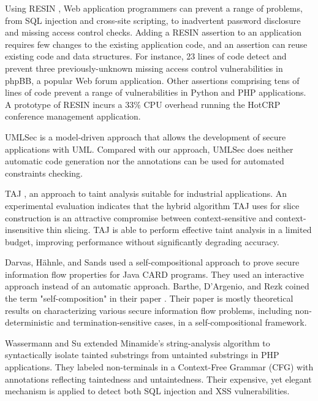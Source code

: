 Using RESIN \cite{ref_63_yip2009improving}, Web application programmers can prevent a range
of problems, from SQL injection and cross-site scripting, to inadvertent password disclosure and missing access control checks. Adding
a RESIN assertion to an application requires few changes to the
existing application code, and an assertion can reuse existing code
and data structures. For instance, 23 lines of code detect and prevent
three previously-unknown missing access control vulnerabilities in
phpBB, a popular Web forum application. Other assertions comprising tens of lines of code prevent a range of vulnerabilities in Python
and PHP applications. A prototype of RESIN incurs a 33\% CPU
overhead running the HotCRP conference management application.

UMLSec \cite{ref_33_juerjens:secure} is a model-driven approach that allows the
development of secure applications with UML. Compared with
our approach, UMLSec does neither automatic code
generation nor the annotations can be used for automated
constraints checking.

TAJ \cite{ref_100_tripp2009taj}, an approach to taint analysis suitable for industrial applications. An experimental evaluation indicates that
the hybrid algorithm TAJ uses for slice construction is an attractive
compromise between context-sensitive and context-insensitive
thin slicing. TAJ is able to perform effective taint analysis in a limited budget, improving performance without significantly degrading accuracy.

Darvas, H{\"a}hnle, and Sands \cite{ref_70_darvas2005theorem} used a self-compositional approach to prove secure information flow properties for Java CARD programs. They used an interactive approach instead of an automatic approach. Barthe, D'Argenio, and Rezk coined the term "self-composition" in their paper \cite{ref_71_barthe2004secure}. Their paper is mostly theoretical results on characterizing various secure information flow problems, including
non-deterministic and termination-sensitive cases, in a self-compositional framework.

Wassermann and Su extended Minamide's string-analysis algorithm
\cite{ref_102_minamide2005static} to syntactically isolate tainted substrings from untainted
substrings in PHP applications. They labeled non-terminals in a
Context-Free Grammar (CFG) with annotations reflecting taintedness
and untaintedness. Their expensive, yet elegant mechanism
is applied to detect both SQL injection and XSS vulnerabilities.

